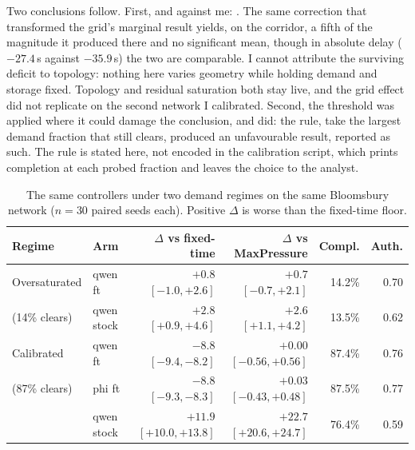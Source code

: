 Two conclusions follow. First, and against me: .
The same correction that transformed the grid's marginal result yields, on
the corridor, a fifth of the magnitude it produced there and no
significant mean, though in absolute delay ($-27.4$\,s against
$-35.9$\,s) the two are comparable.
I cannot attribute the surviving deficit to topology: nothing here varies
geometry while holding demand and storage fixed. Topology and residual saturation both stay live, and the
grid effect did not replicate on the second network I
calibrated. Second, the threshold was applied where it could damage the
conclusion, and did: the rule, take the largest demand fraction
that still clears, produced an unfavourable result, reported as such. The
rule is stated here, not encoded in the calibration script, which prints
completion at each probed fraction and leaves the choice to the analyst.

\begin{table}[t]
\caption{The same controllers under two demand regimes on the same
Bloomsbury network ($n{=}30$ paired seeds each). Positive $\Delta$ is
worse than the fixed-time floor.}
\label{tab:calib}
\centering
\small
\begin{tabular}{llrrrr}
\toprule
Regime & Arm & $\Delta$ vs fixed-time & $\Delta$ vs MaxPressure & Compl. & Auth. \\
\midrule
Oversaturated & qwen ft & $+0.8$ $[-1.0, +2.6]$ & $+0.7$ $[-0.7, +2.1]$ & 14.2\% & 0.70 \\
(14\% clears) & qwen stock & $\mathbf{+2.8}$ $[+0.9, +4.6]$ & $\mathbf{+2.6}$ $[+1.1, +4.2]$ & 13.5\% & 0.62 \\
\midrule
Calibrated & qwen ft & $\mathbf{-8.8}$ $[-9.4, -8.2]$ & $+0.00$ $[-0.56, +0.56]$ & 87.4\% & 0.76 \\
(87\% clears) & phi ft & $\mathbf{-8.8}$ $[-9.3, -8.3]$ & $+0.03$ $[-0.43, +0.48]$ & 87.5\% & 0.77 \\
 & qwen stock & $\mathbf{+11.9}$ $[+10.0, +13.8]$ & $\mathbf{+22.7}$ $[+20.6, +24.7]$ & 76.4\% & 0.59 \\
\bottomrule
\end{tabular}
\end{table}



